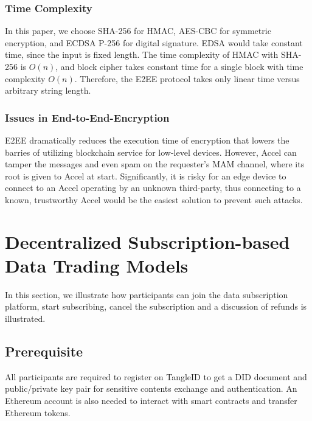 \documentclass[10pt, conference, compsocconf]{IEEEtran}
\begin{document}
\subsubsection{Time Complexity}
In this paper, we choose SHA-256 for HMAC, AES-CBC for symmetric encryption, and ECDSA P-256 for digital signature. EDSA would take constant time, since the input is fixed length. The time complexity of HMAC with SHA-256 is $O(n)$\cite{hmac_time_complexity}, and block cipher takes constant time for a single block with time complexity $O(n)$. Therefore, the E2EE protocol takes only linear time versus arbitrary string length.

\subsubsection{Issues in End-to-End-Encryption}
E2EE dramatically reduces the execution time of encryption that lowers the barries of utilizing blockchain service for low-level devices. However, Accel can tamper the messages and even spam on the requester's MAM channel, where its root is given to Accel at start. Significantly, it is risky for an edge device to connect to an Accel operating by an unknown third-party, thus connecting to a known, trustworthy Accel would be the easiest solution to prevent such attacks.

\section{Decentralized Subscription-based Data Trading Models}
\label{section:trading_model}
In this section, we illustrate how participants can join the data subscription platform, start subscribing, cancel the subscription and a discussion of refunds is illustrated.

\subsection{Prerequisite}
All participants are required to register on TangleID to get a DID document and public/private key pair for sensitive contents exchange and authentication. An Ethereum account is also needed to interact with smart contracts and transfer Ethereum tokens.
\end{document}
